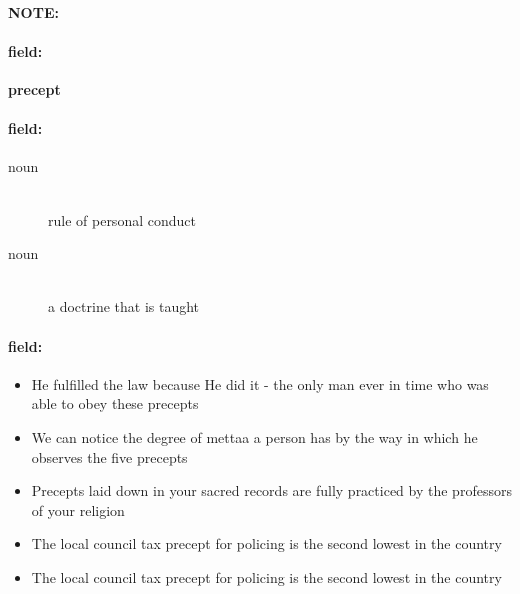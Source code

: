 \documentclass[12pt]{article}
\newenvironment{note}{\paragraph{NOTE:}}{}
\newenvironment{field}{\paragraph{field:}}{}
\begin{document}
\begin{note}
\begin{field}
\textbf{\large precept}
\end{field}


\begin{field}
\begin{description}
\item[noun] \hfill \\ 
rule of personal conduct

\item[noun] \hfill \\ 
a doctrine that is taught

\end{description}
\end{field}

\begin{field}
\begin{itemize}
\item He fulfilled the law because He did it - the only man ever in time who was able to obey these precepts
\item We can notice the degree of mettaa a person has by the way in which he observes the five precepts
\item Precepts laid down in your sacred records are fully practiced by the professors of your religion
\item The local council tax precept for policing is the second lowest in the country
\item The local council tax precept for policing is the second lowest in the country
\end{itemize}
\end{field}
\end{note}
\end{document}
